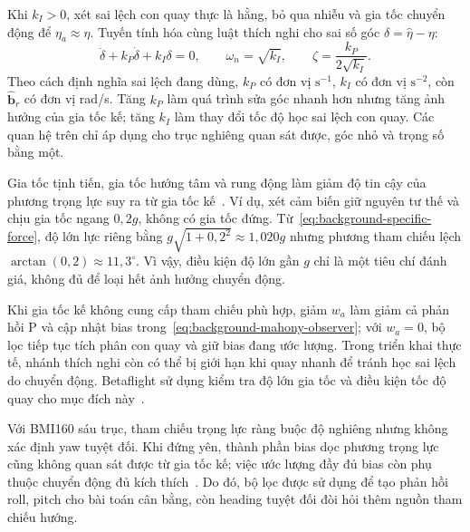 Khi $k_I>0$, xét sai lệch con quay thực là hằng, bỏ qua nhiễu và gia tốc chuyển động để $\eta_a\approx\eta$. Tuyến tính hóa cùng luật thích nghi cho sai số góc $\delta=\hat\eta-\eta$:
\begin{equation}
    \ddot\delta+k_P\dot\delta+k_I\delta=0,
    \qquad
    \omega_n=\sqrt{k_I},\qquad
    \zeta=\frac{k_P}{2\sqrt{k_I}}.
    \label{eq:background-mahony-local-error}
\end{equation}
Theo cách định nghĩa sai lệch đang dùng, $k_P$ có đơn vị $\mathrm{s^{-1}}$, $k_I$ có đơn vị $\mathrm{s^{-2}}$, còn $\hat{\mathbf b}_r$ có đơn vị rad/s. Tăng $k_P$ làm quá trình sửa góc nhanh hơn nhưng tăng ảnh hưởng của gia tốc kế; tăng $k_I$ làm thay đổi tốc độ học sai lệch con quay. Các quan hệ trên chỉ áp dụng cho trục nghiêng quan sát được, góc nhỏ và trọng số bằng một.

Gia tốc tịnh tiến, gia tốc hướng tâm và rung động làm giảm độ tin cậy của phương trọng lực suy ra từ gia tốc kế~\cite{fisher2010inclination}. Ví dụ, xét cảm biến giữ nguyên tư thế và chịu gia tốc ngang $0{,}2g$, không có gia tốc đứng. Từ~\eqref{eq:background-specific-force}, độ lớn lực riêng bằng $g\sqrt{1+0{,}2^2}\approx1{,}020g$ nhưng phương tham chiếu lệch $\arctan(0{,}2)\approx11{,}3^\circ$. Vì vậy, điều kiện độ lớn gần $g$ chỉ là một tiêu chí đánh giá, không đủ để loại hết ảnh hưởng chuyển động.

Khi gia tốc kế không cung cấp tham chiếu phù hợp, giảm $w_a$ làm giảm cả phản hồi P và cập nhật bias trong~\eqref{eq:background-mahony-observer}; với $w_a=0$, bộ lọc tiếp tục tích phân con quay và giữ bias đang ước lượng. Trong triển khai thực tế, nhánh thích nghi còn có thể bị giới hạn khi quay nhanh để tránh học sai lệch do chuyển động. Betaflight sử dụng kiểm tra độ lớn gia tốc và điều kiện tốc độ quay cho mục đích này~\cite{betaflight452Mahony}.

Với BMI160 sáu trục, tham chiếu trọng lực ràng buộc độ nghiêng nhưng không xác định yaw tuyệt đối. Khi đứng yên, thành phần bias dọc phương trọng lực cũng không quan sát được từ gia tốc kế; việc ước lượng đầy đủ bias còn phụ thuộc chuyển động đủ kích thích~\cite{hamel2006attitude}. Do đó, bộ lọc được sử dụng để tạo phản hồi roll, pitch cho bài toán cân bằng, còn heading tuyệt đối đòi hỏi thêm nguồn tham chiếu hướng.

